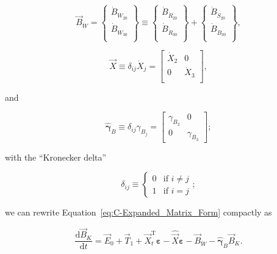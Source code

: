 \begin{equation} \label{eq:waste_vec_def}
	\vec{B}_{\dot{W}} 
	=
	\begin{Bmatrix}
		\dot{B}_{\dot{W}_{20}}	\\
		\dot{B}_{\dot{W}_{30}}	\\
	\end{Bmatrix}
	\equiv
	\begin{Bmatrix}
		\dot{B}_{\dot{R}_{20}}	\\
		\dot{B}_{\dot{R}_{30}}	\\
	\end{Bmatrix}
	+
	\begin{Bmatrix}
		\dot{B}_{\dot{S}_{20}}	\\
		\dot{B}_{\dot{B}_{30}}	\\
	\end{Bmatrix},
\end{equation}

\begin{equation} \label{eq:X_hat_matrix_def}
	\hat{\vec{X}} 
	\equiv
	\delta_{ij} \dot{X}_{j} 
	= 
	\begin{bmatrix}
		\dot{X}_{2}		&	0	  \\
		0				&	\dot{X}_{3}	\\
	\end{bmatrix},
\end{equation} 

\noindent{}and

\begin{equation} \label{eq:gamma_hat_matrix_def}
	\hat{\boldsymbol{\gamma}}_{B}
	\equiv
	\delta_{ij} \gamma_{B_{j}}
	=
	\begin{bmatrix}
		\gamma_{B_{2}} & 0         \\
		0              & \gamma_{B_{3}}
	\end{bmatrix};
\end{equation}

\noindent{}with the ``Kronecker delta''

\begin{equation}\label{eq:k_delta}
	\delta_{ij} 
	\equiv
	\begin{cases}	
		0	&	\text{if  } i \neq j	\\
		1 	& 	\text{if  } i = j
	\end{cases};
\end{equation}

\noindent{}we can rewrite Equation~\ref{eq:C-Expanded_Matrix_Form}
compactly as

\begin{equation} \label{eq:matrix_leontief_pre_1}
	\frac{\mathrm{d}\vec{B}_{K}}{\mathrm{d}t} 
	= \vec{E}_{0}
	+ \vec{T}_{1}
	+ \vec{X}_{t}^{\mathrm{T}}\boldsymbol{\varepsilon} 
	- \hat{\vec{X}}\boldsymbol{\varepsilon}
	- \vec{B}_{\dot{W}}
	- \hat{\boldsymbol{\gamma}}_{B} \vec{B}_{K}.
\end{equation}

